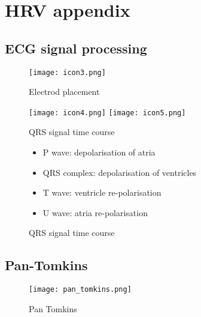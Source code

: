 \section{HRV appendix}
\subsection{\small ECG signal processing}


\begin{figure}[!htbp]
    \centering
    \texttt{[image: icon3.png]}
    \caption{Electrod placement}
    \label{icon3}
\end{figure}

\begin{figure}[!htbp]
%
\centering
    \texttt{[image: icon4.png]}
\endminipage\hfill
{}%
\centering
    \texttt{[image: icon5.png]}
\endminipage\hfill
\caption{QRS signal time course}\label{icon4}
\end{figure}

\begin{figure}[!htbp]
%
\centering
\begin{itemize}
    \item P wave: depolarisation of atria
    \item QRS complex: depolarisation of ventricles
\end{itemize}
\endminipage\hfill
{}%
\centering
\begin{itemize}
    \item T wave: ventricle re-polarisation
    \item U wave: atria re-polarisation
\end{itemize}
\endminipage\hfill
\caption{QRS signal time course}\label{icon4}
\end{figure}



\newpage
\subsection{\small Pan-Tomkins}\label{algo1}

\begin{figure}[!htbp]
\centering
\texttt{[image: pan\_tomkins.png]}
\caption{Pan Tomkins}
\end{figure}


